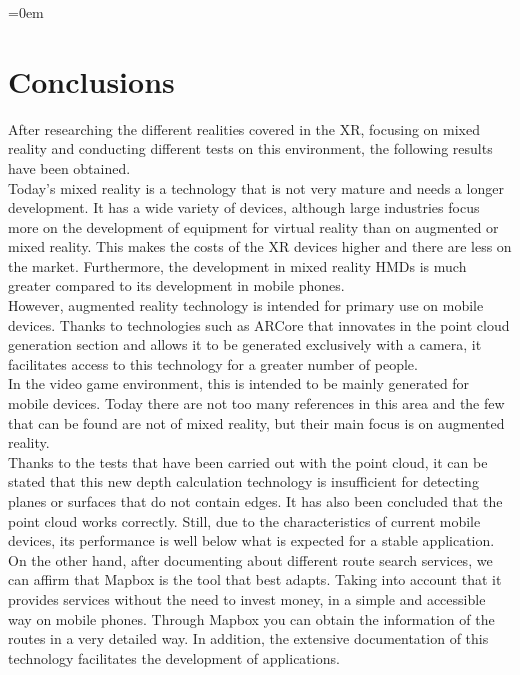 \parindent=0em
\addtocounter{chapter}{-1}
\chapter{Conclusions}
\noindent

After researching the different realities covered in the XR, focusing on mixed reality and conducting different tests on this environment, the following results have been obtained. \\

Today's mixed reality is a technology that is not very mature and needs a longer development. It has a wide variety of devices, although large industries focus more on the development of equipment for virtual reality than on augmented or mixed reality. This makes the costs of the XR devices higher and there are less on the market. Furthermore, the development in mixed reality HMDs is much greater compared to its development in mobile phones. \\

However, augmented reality technology is intended for primary use on mobile devices. Thanks to technologies such as ARCore that innovates in the point cloud generation section and allows it to be generated exclusively with a camera, it facilitates access to this technology for a greater number of people. \\

In the video game environment, this is intended to be mainly generated for mobile devices. Today there are not too many references in this area and the few that can be found are not of mixed reality, but their main focus is on augmented reality. \\

Thanks to the tests that have been carried out with the point cloud, it can be stated that this new depth calculation technology is insufficient for detecting planes or surfaces that do not contain edges. It has also been concluded that the point cloud works correctly. Still, due to the characteristics of current mobile devices, its performance is well below what is expected for a stable application. \\

On the other hand, after documenting about different route search services, we can affirm that Mapbox is the tool that best adapts. Taking into account that it provides services without the need to invest money, in a simple and accessible way on mobile phones. Through Mapbox you can obtain the information of the routes in a very detailed way. In addition, the extensive documentation of this technology facilitates the development of applications. \\


